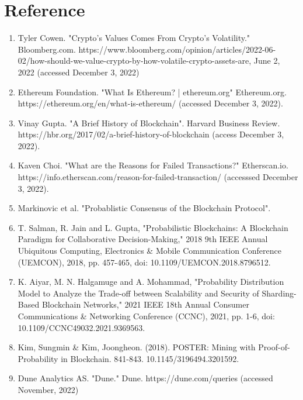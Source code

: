 \documentclass[12pt]{article}
\begin{document}

\pagebreak
\section{Reference}
\begin{enumerate}
	\item Tyler Cowen. "Crypto's Values Comes From Crypto's Volatility." Bloomberg.com. https://www.bloomberg.com/opinion/articles/2022-06-02/how-should-we-value-crypto-by-how-volatile-crypto-assets-are, June 2, 2022 (accessed December 3, 2022)
	\item Ethereum Foundation. "What Is Ethereum? | ethereum.org" Ethereum.org. \\https://ethereum.org/en/what-is-ethereum/ (accessed December 3, 2022).
	\item Vinay Gupta. "A Brief History of Blockchain". Harvard Business Review. \\ https://hbr.org/2017/02/a-brief-history-of-blockchain (access December 3, 2022).
	\item Kaven Choi. "What are the Reasons for Failed Transactions?" Etherscan.io.\\ https://info.etherscan.com/reason-for-failed-transaction/ (accesssed December 3, 2022).
	\item Markinovic et al. "Probablistic Consensus of the Blockchain Protocol". \\ %
	\item T. Salman, R. Jain and L. Gupta, "Probabilistic Blockchains: A Blockchain Paradigm for Collaborative Decision-Making," 2018 9th IEEE Annual Ubiquitous Computing, Electronics \& Mobile Communication Conference (UEMCON), 2018, pp. 457-465, doi: 10.1109/UEMCON.2018.8796512.
	\item K. Aiyar, M. N. Halgamuge and A. Mohammad, "Probability Distribution Model to Analyze the Trade-off between Scalability and Security of Sharding-Based Blockchain Networks," 2021 IEEE 18th Annual Consumer Communications \& Networking Conference (CCNC), 2021, pp. 1-6, doi: 10.1109/CCNC49032.2021.9369563.
	\item Kim, Sungmin \& Kim, Joongheon. (2018). POSTER: Mining with Proof-of-Probability in Blockchain. 841-843. 10.1145/3196494.3201592. 
	\item Dune Analytics AS. "Dune." Dune. https://dune.com/queries (accessed November, 2022)
\end{enumerate}
\end{document}
